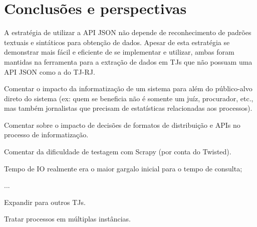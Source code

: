 \chapter{Conclusões e perspectivas~\label{chp:conclusions}}

A estratégia de utilizar a API JSON não depende de reconhecimento de padrões
textuais e sintáticos para obtenção de dados. Apesar de esta estratégia se
demonstrar mais fácil e eficiente de se implementar e utilizar, ambas foram
mantidas na ferramenta para a extração de dados em TJs que não possuam uma API
JSON como a do TJ-RJ.

\begin{todolist}
    \item Comentar o impacto da informatização de um sistema para além do
          público-alvo direto do sistema (ex: quem se beneficia não é somente
          um juíz, procurador, etc., mas também jornalistas que precisam de
          estatísticas relacionadas aos processos).
    \item Comentar sobre o impacto de decisões de formatos de distribuição e
          APIs no processo de informatização.
\end{todolist}

\begin{todolist}
    \item Comentar da dificuldade de testagem com Scrapy (por conta do Twisted).
\end{todolist}


\begin{todolist}
    \item Tempo de IO realmente era o maior gargalo inicial para o tempo de consulta;
    \item ...
\end{todolist}

\begin{todolist}
    \item Expandir para outros TJs.
    \item Tratar processos em múltiplas instâncias.
\end{todolist}
